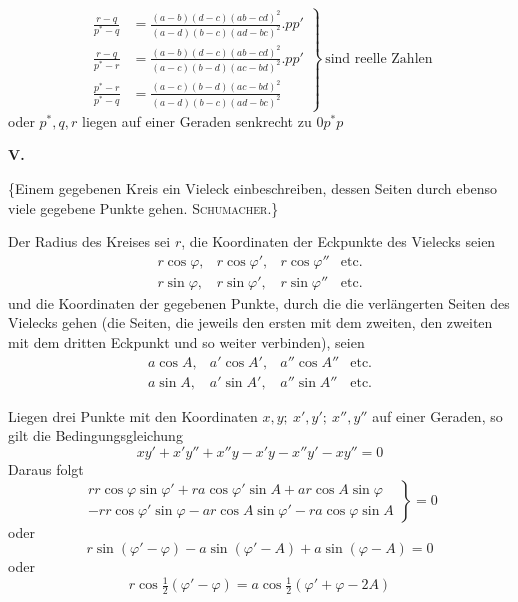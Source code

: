 %
\[
\left.\begin{aligned}
\frac{r-q}{p^*-q}&=\frac{(a-b)(d-c)(ab-cd)^2}{(a-d)(b-c)(ad-bc)^2}.pp'\\
\frac{r-q}{p^*-r}&=\frac{(a-b)(d-c)(ab-cd)^2}{(a-c)(b-d)(ac-bd)^2}.pp'\\
\frac{p^*-r}{p^*-q}&=\frac{(a-c)(b-d)(ac-bd)^2}{(a-d)(b-c)(ad-bc)^2}
\end{aligned}\right\}\ \text{sind reelle Zahlen}
\]
oder \(p^*,q,r\) liegen auf einer Geraden senkrecht zu \(0p^*p\)
\par\medskip{}
\centerline{\textbf{V.}}\nobreak\smallskip
\{Einem gegebenen Kreis ein Vieleck einbeschreiben, dessen Seiten durch ebenso viele gegebene Punkte gehen. \textsc{Schumacher}.\}

Der Radius des Kreises sei \(r\), die Koordinaten der Eckpunkte des Vielecks seien
\[
\begin{array}{llll}
r\cos\varphi,&r\cos\varphi',&r\cos\varphi''&\text{etc.}\\
r\sin\varphi,&r\sin\varphi',&r\sin\varphi''&\text{etc.}
\end{array}
\]
und die Koordinaten der gegebenen Punkte, durch die die verlängerten Seiten des Vielecks gehen (die Seiten, die jeweils den ersten mit dem zweiten, den zweiten mit dem dritten Eckpunkt und so weiter verbinden), seien
\[
\begin{array}{llll}
a\cos A,&a'\cos A',&a''\cos A''&\text{etc.}\\
a\sin A,&a'\sin A',&a''\sin A''&\text{etc.}
\end{array}
\]
\par
Liegen drei Punkte mit den Koordinaten \(x,y;\ x',y';\ x'',y''\) auf einer Geraden, so gilt die Bedingungsgleichung
\[
xy'+x'y''+x''y-x'y-x''y'-xy''=0
\]
Daraus folgt
\[
\left.\begin{aligned}
rr\cos\varphi\sin\varphi'+ra\cos\varphi'\sin A+ar\cos A\sin\varphi\\
-rr\cos\varphi'\sin\varphi-ar\cos A\sin\varphi'-ra\cos\varphi\sin A
\end{aligned}\right\}=0
\]
oder
\[
r\sin(\varphi'-\varphi)-a\sin(\varphi'-A)+a\sin(\varphi-A)=0
\]
oder
\[
r\cos\tfrac12(\varphi'-\varphi)=a\cos\tfrac12(\varphi'+\varphi-2A)
\]
